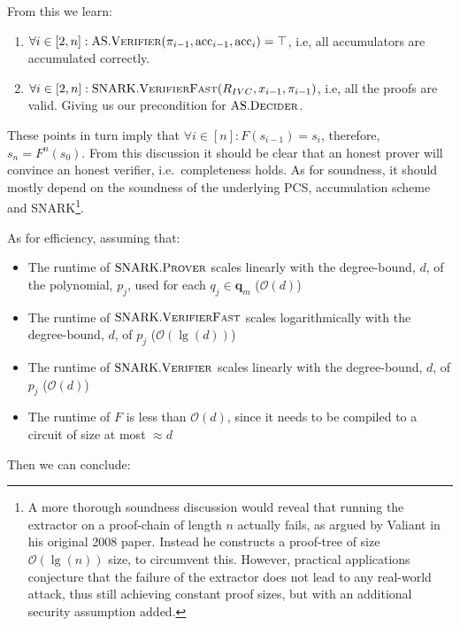 \documentclass[
]{article}
\providecommand{\tightlist}{%
  \setlength{\itemsep}{0pt}\setlength{\parskip}{0pt}}
\newcommand*\Oc{\mathcal{O}}
\renewcommand{\vec}[1]{ \boldsymbol{#1} }
\newcommand*{\acc}{\mathrm{acc}}
\newcommand*{\Prover}{\mathrm{\text{P\scriptsize ROVER}}}
\newcommand*{\Verifier}{\mathrm{\text{V\scriptsize ERIFIER}}}
\newcommand*{\Decider}{\mathrm{\text{D{\scriptsize ECIDER}}}}
\newcommand*{\SNARKProver}{\mathrm{\text{SNARK}}.\Prover}
\newcommand*{\SNARKVerifier}{\mathrm{\text{SNARK}}.\Verifier}
\newcommand*{\SNARKVerifierFast}{\mathrm{\text{SNARK}}.\mathrm{\text{V\scriptsize ERIFIER}\text{F\scriptsize AST}}}
\newcommand*{\AS}{\text{AS}}
\newcommand*{\ASVerifier}{\AS.\Verifier}
\newcommand*{\ASDecider}{\AS.\Decider}
\begin{document}
From this we learn:

\begin{enumerate}
\def\labelenumi{\arabic{enumi}.}
\tightlist
\item
  \(\forall i \in [2, n] : \ASVerifier(\pi_{i-1}, \acc_{i-1}, \acc_i) = \top\),
  i.e, all accumulators are accumulated correctly.
\item
  \(\forall i \in [2, n] : \SNARKVerifierFast(R_{IVC}, x_{i-1}, \pi_{i-1})\),
  i.e, all the proofs are valid. Giving us our precondition for
  \(\ASDecider\).
\end{enumerate}

These points in turn imply that
\(\forall i \in [n] : F(s_{i-1}) = s_i\), therefore, \(s_n = F^n(s_0)\).
From this discussion it should be clear that an honest prover will
convince an honest verifier, i.e.~completeness holds. As for soundness,
it should mostly depend on the soundness of the underlying PCS,
accumulation scheme and SNARK\footnote{A more thorough soundness
  discussion would reveal that running the extractor on a proof-chain of
  length \(n\) actually fails, as argued by Valiant in his original 2008
  paper. Instead he constructs a proof-tree of size \(\Oc(\lg(n))\)
  size, to circumvent this. However, practical applications conjecture
  that the failure of the extractor does not lead to any real-world
  attack, thus still achieving constant proof sizes, but with an
  additional security assumption added.}.

As for efficiency, assuming that:

\begin{itemize}
\tightlist
\item
  The runtime of \(\SNARKProver\) scales linearly with the degree-bound,
  \(d\), of the polynomial, \(p_j\), used for each \(q_j \in \vec{q}_m\)
  (\(\Oc(d)\))
\item
  The runtime of \(\SNARKVerifierFast\) scales logarithmically with the
  degree-bound, \(d\), of \(p_j\) (\(\Oc(\lg(d))\))
\item
  The runtime of \(\SNARKVerifier\) scales linearly with the
  degree-bound, \(d\), of \(p_j\) (\(\Oc(d)\))
\item
  The runtime of \(F\) is less than \(\Oc(d)\), since it needs to be
  compiled to a circuit of size at most \(\approx d\)
\end{itemize}

Then we can conclude:
\end{document}

